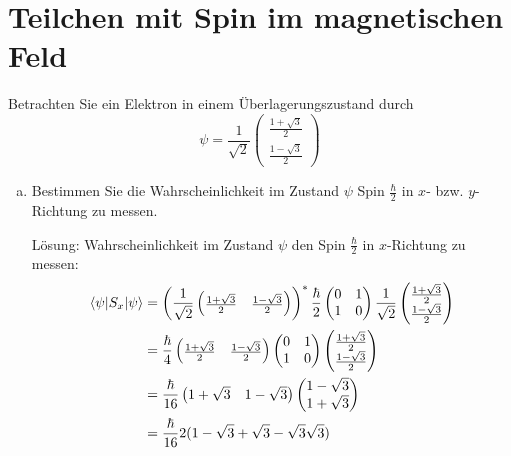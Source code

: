 \documentclass{scrartcl}
\begin{document}
\section{Teilchen mit Spin im magnetischen Feld}
Betrachten Sie ein Elektron in einem Überlagerungszustand durch
\[\psi=\frac{1}{\sqrt 2}\begin{pmatrix}\frac{1+\sqrt 3}{2}\\\frac{1-\sqrt 3}{2}\end{pmatrix}\]

\begin{enumerate}[a)]
\item Bestimmen Sie die Wahrscheinlichkeit im Zustand $\psi$ Spin $\frac{\hbar}{2}$ in $x$- bzw. $y$-Richtung zu messen.
\item[Lösung:]
Wahrscheinlichkeit im Zustand $\psi$ den Spin $\frac\hbar 2$ in $x$-Richtung zu messen:
\begin{align*}
\braket{\psi|S_x|\psi}	
	&= 
	\left(\frac 1{\sqrt 2} \begin{pmatrix}\frac{1+\sqrt 3}{2} & \frac{1-\sqrt 3}{2}\end{pmatrix}\right)^\ast
	\frac \hbar 2 \begin{pmatrix} 0&1\\1&0 \end{pmatrix}
	\frac 1{\sqrt 2}\begin{pmatrix}\frac{1+\sqrt 3}{2}\\\frac{1-\sqrt 3}{2}\end{pmatrix}\\
	&= 	
	\frac \hbar 4 \begin{pmatrix}\frac{1+\sqrt 3}{2} & \frac{1-\sqrt 3}{2}\end{pmatrix}
	\begin{pmatrix} 0&1\\1&0 \end{pmatrix}
	\begin{pmatrix}\frac{1+\sqrt 3}{2}\\\frac{1-\sqrt 3}{2}\end{pmatrix}\\
	&=
	\frac \hbar {16} \begin{pmatrix}1+\sqrt 3 & 1-\sqrt 3\end{pmatrix}
	\begin{pmatrix}1-\sqrt 3\\1+\sqrt 3\end{pmatrix}\\
	&=
	\frac \hbar {16} 2 (1 -\sqrt 3 +\sqrt 3 -\sqrt 3 \sqrt 3)\\ 

\end{align*}
\end{enumerate}
\end{document}
